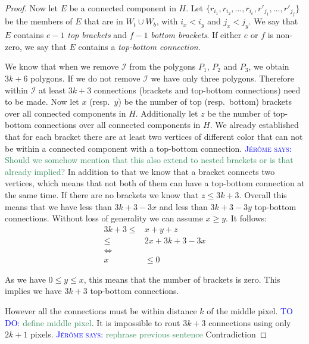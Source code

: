 \documentclass[a4paper, UKenglish]{lipics-v2018}
\newcommand{\mremark}[3]{\textcolor{blue}{\textsc{#1 #2:}} \textcolor{SeaGreen}{\textsf{#3}}}
\newcommand{\jerome}[2][says]{\mremark{J\'er\^ome}{#1}{#2}}
\newcommand{\todo}[2][DO]{\mremark{TO}{#1}{#2}}
\newcommand{\ixi}{\mathcal{I}}
\begin{document}
\begin{proof}
Now let $E$ be a connected component in $H$. Let $\{r_{i_1}, r_{i_2}, \dots, r_{i_e}, r'_{j_1}, \dots, r'_{j_f}\}$ be the members of $E$ that are in $W_t\cup W_b$, with $i_x<i_y$ and $j_x<j_y$. We say that $E$ contains $e-1$ \emph{top brackets} and $f-1$ \emph{bottom brackets}. If either $e$ or $f$ is non-zero, we say that $E$ contains a \emph{top-bottom connection}.

We know that when we remove $\ixi$ from the polygons $P_1$, $P_2$ and $P_3$, we obtain $3k+6$ polygons. If we do not remove $\ixi$ we have only three polygons. Therefore within $\ixi$ at least $3k+3$ connections (brackets and top-bottom connections) need to be made.
Now let $x$ (resp.\ $y$) be the number of top (resp.\ bottom) brackets over all connected components in $H$. Additionally let $z$ be the number of top-bottom connections over all connected components in $H$.
We already established that for each bracket there are at least two vertices of different color that can not be within a connected component with a top-bottom connection.
\jerome{Should we somehow mention that this also extend to nested brackets or is that already implied?}
In addition to that we know that a bracket connects two vertices, which means that not both of them can have a top-bottom connection at the same time.
If there are no brackets we know that $z\leq 3 k +3$.
Overall this means that we have less than $3k+3 - 3x$ and less than $3k+3 - 3y$ top-bottom connections.
Without loss of generality we can assume $x\geq y$.
It follows:
\begin{align*}
    3k+3\leq& x+y+z\\
    \leq& 2x + 3k+3 - 3x \\
    \iff& \\
    x&\leq 0 
\end{align*}

As we have $0\leq y\leq x$, this means that the number of brackets is zero. This implies we have $3k+3$ top-bottom connections.

However all the connections must be within distance $k$ of the middle pixel. \todo{define middle pixel}. It is impossible to rout $3k+3$ connections using only $2k+1$ pixels. \jerome{rephrase previous sentence}
Contradiction





\end{proof}
\end{document}
